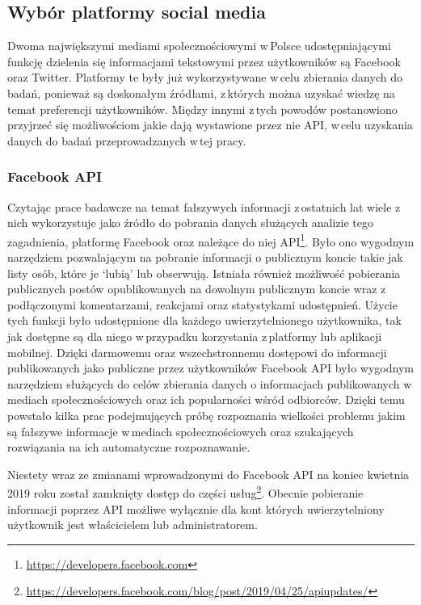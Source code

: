 
\subsection{Wybór platformy social media}
Dwoma największymi mediami społecznościowymi w\,Polsce udostępniającymi funkcję dzielenia się informacjami tekstowymi przez użytkowników są Facebook oraz Twitter\cite{GemiusSerwisy2019}. Platformy te były już wykorzystywane w\,celu zbierania danych do badań, ponieważ są doskonałym źródłami, z\,których można uzyskać wiedzę na temat preferencji użytkowników. Między innymi z\,tych powodów postanowiono przyjrzeć się możliwościom jakie dają wystawione przez nie API, w\,celu uzyskania danych do badań przeprowadzanych w\,tej pracy.

\subsubsection{Facebook API}
Czytając prace badawcze na temat fałszywych informacji z\,ostatnich lat wiele z\,nich wykorzystuje jako źródło do pobrania danych służących analizie tego zagadnienia, platformę Facebook oraz należące do niej API\footnote{\url{https://developers.facebook.com}}. Było ono wygodnym narzędziem pozwalającym na pobranie informacji o publicznym koncie takie jak listy osób, które je ‘lubią’ lub obserwują. Istniała również możliwość pobierania publicznych postów opublikowanych na dowolnym publicznym koncie wraz z\,podłączonymi komentarzami, reakcjami oraz statystykami udostępnień. Użycie tych funkcji było udostępnione dla każdego uwierzytelnionego użytkownika, tak jak dostępne są dla niego w\,przypadku korzystania z\,platformy lub aplikacji mobilnej. Dzięki darmowemu oraz wszechstronnemu dostępowi do informacji publikowanych jako publiczne przez użytkowników Facebook API było wygodnym narzędziem służących do celów zbierania danych o informacjach publikowanych w\,mediach społecznościowych oraz ich popularności wśród odbiorców. Dzięki temu powstało kilka prac podejmujących próbę rozpoznania wielkości problemu jakim są fałszywe informacje w\,mediach społecznościowych oraz szukających rozwiązania na ich automatyczne rozpoznawanie. 
\par
Niestety wraz ze zmianami wprowadzonymi do Facebook API na koniec kwietnia 2019 roku został zamknięty dostęp do części usług\footnote{\url{https://developers.facebook.com/blog/post/2019/04/25/apiupdates/}}. Obecnie pobieranie informacji poprzez API możliwe wyłącznie dla kont których uwierzytelniony użytkownik jest właścicielem lub administratorem.
